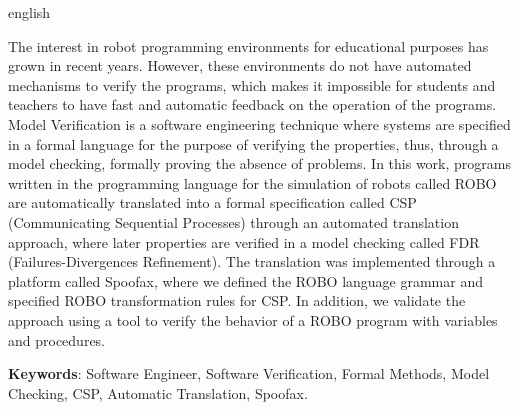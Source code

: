 \begin{resumo}[Abstract]
 \begin{otherlanguage*}{english}
  
The interest in robot programming environments for educational purposes has grown in recent years. However, these environments do not have automated mechanisms to verify the programs, which makes it impossible for students and teachers to have fast and automatic feedback on the operation of the programs. Model Verification is a software engineering technique where systems are specified in a formal language for the purpose of verifying the properties, thus, through a model checking, formally proving the absence of problems. In this work, programs written in the programming language for the simulation of robots called ROBO are automatically translated into a formal specification called CSP (Communicating Sequential Processes) through an automated translation approach, where later properties are verified in a model checking called FDR (Failures-Divergences Refinement). The translation was implemented through a platform called Spoofax, where we defined the ROBO language grammar and specified ROBO transformation rules for CSP. In addition, we validate the approach using a tool to verify the behavior of a ROBO program with variables and procedures.

   \vspace{\onelineskip}
 
   \noindent 
   \textbf{Keywords}:  Software Engineer, Software Verification, Formal Methods, Model Checking, CSP, Automatic Translation, Spoofax.
 \end{otherlanguage*}
\end{resumo}